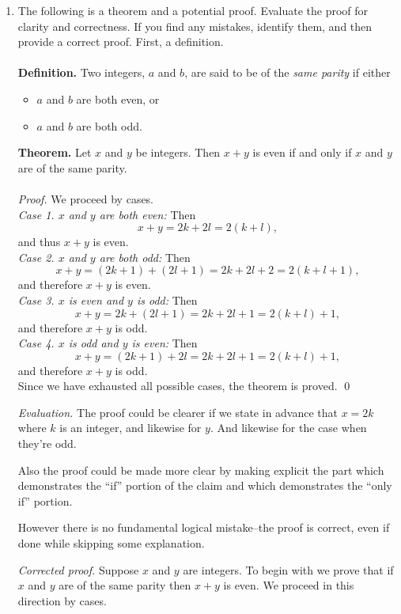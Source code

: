 \documentclass[12pt]{article}
\begin{document}
\begin{enumerate}
\item The following is a theorem and a potential proof. Evaluate the proof for clarity and correctness. If you find any mistakes, identify them, and then provide a correct proof. First, a definition.\\\\
\textbf{Definition.} Two integers, $a$ and $b$, are said to be of the \emph{same parity} if either
\begin{itemize}
\item $a$ and $b$ are both even, or
\item $a$ and $b$ are both odd.
\end{itemize}
\textbf{Theorem.} Let $x$ and $y$ be integers. Then $x + y$ is even if and only if $x$ and $y$ are of the same parity.\\\\
\emph{Proof.} We proceed by cases.\\
\textit{Case 1. $x$ and $y$ are both even:} Then \[x + y = 2k + 2l = 2(k + l),\] and thus $x + y$ is even.\\
\textit{Case 2. $x$ and $y$ are both odd:} Then \[x + y = (2k + 1) + (2l + 1) = 2k + 2l + 2 = 2(k + l + 1),\] and therefore $x + y$ is even.\\
\textit{Case 3. $x$ is even and $y$ is odd:} Then \[x + y = 2k + (2l + 1) = 2k + 2l + 1 = 2(k + l) + 1,\] and therefore $x + y$ is odd.\\
\textit{Case 4. $x$ is odd and $y$ is even:} Then \[x + y = (2k + 1) + 2l = 2k + 2l + 1 = 2(k + l) + 1,\] and therefore $x + y$ is odd.\\
Since we have exhausted all possible cases, the theorem is proved. \qed


{\it Evaluation.}  The proof could be clearer if we state in advance that $x=2k$ where $k$  is an integer, and likewise for $y$.  And likewise for the case when they're odd.  

Also the proof could be made more clear by making explicit the part which demonstrates the ``if'' portion of the claim and which demonstrates the ``only if'' portion.

However there is no fundamental logical mistake--the proof is correct, even if done while skipping some explanation.

{\it Corrected proof.}  Suppose $x$ and $y$ are integers.  To begin with we prove that if $x$ and $y$ are of the same parity then $x+y$ is even.  We proceed in this direction by cases.


\end{enumerate}
\end{document}
